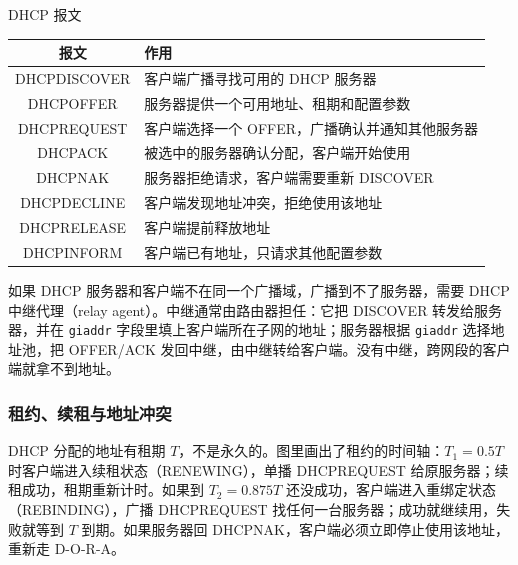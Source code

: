\begin{tablebox}{DHCP 报文}
\centering
\begin{tabularx}{\linewidth}{|c|X|}
\hline
\textbf{报文} & \textbf{作用} \\
\hline
DHCPDISCOVER & 客户端广播寻找可用的 DHCP 服务器 \\
DHCPOFFER & 服务器提供一个可用地址、租期和配置参数 \\
DHCPREQUEST & 客户端选择一个 OFFER，广播确认并通知其他服务器 \\
DHCPACK & 被选中的服务器确认分配，客户端开始使用 \\
DHCPNAK & 服务器拒绝请求，客户端需要重新 DISCOVER \\
DHCPDECLINE & 客户端发现地址冲突，拒绝使用该地址 \\
DHCPRELEASE & 客户端提前释放地址 \\
DHCPINFORM & 客户端已有地址，只请求其他配置参数 \\
\hline
\end{tabularx}
\end{tablebox}

如果 DHCP 服务器和客户端不在同一个广播域，广播到不了服务器，需要 DHCP 中继代理（relay agent）。中继通常由路由器担任：它把 DISCOVER 转发给服务器，并在 \texttt{giaddr} 字段里填上客户端所在子网的地址；服务器根据 \texttt{giaddr} 选择地址池，把 OFFER/ACK 发回中继，由中继转给客户端。没有中继，跨网段的客户端就拿不到地址。

\subsubsection{租约、续租与地址冲突}

DHCP 分配的地址有租期 $T$，不是永久的。图里画出了租约的时间轴：$T_1=0.5T$ 时客户端进入续租状态（RENEWING），单播 DHCPREQUEST 给原服务器；续租成功，租期重新计时。如果到 $T_2=0.875T$ 还没成功，客户端进入重绑定状态（REBINDING），广播 DHCPREQUEST 找任何一台服务器；成功就继续用，失败就等到 $T$ 到期。如果服务器回 DHCPNAK，客户端必须立即停止使用该地址，重新走 D-O-R-A。

